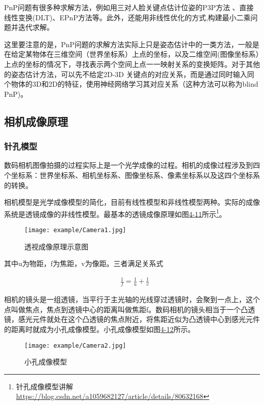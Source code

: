 PnP问题有很多种求解方法，例如用三对人脸关键点估计位姿的P3P方法 、直接线性变换(DLT)、EPnP方法等。此外，还能用非线性优化的方式,构建最小二乘问题并迭代求解。

这里要注意的是，PnP问题的求解方法实际上只是姿态估计中的一类方法，一般是在给定某物体在三维空间（世界坐标系）上点的坐标，以及二维空间(图像坐标系）上点的坐标的情况下，寻找表示两个空间上点一一映射关系的变换矩阵。对于其他的姿态估计方法，可以先不给定2D-3D 关键点的对应关系，而是通过同时输入同个物体的3D和2D的特征，使用神经网络学习其对应关系（这种方法可以称为blind PnP)。

\subsection{相机成像原理}

\subsubsection{针孔模型}

数码相机图像拍摄的过程实际上是一个光学成像的过程。相机的成像过程涉及到四个坐标系：世界坐标系、相机坐标系、图像坐标系、像素坐标系以及这四个坐标系的转换。

相机模型是光学成像模型的简化，目前有线性模型和非线性模型两种。实际的成像系统是透镜成像的非线性模型。最基本的透镜成像原理如图\href{fig:4-11}{4-11}所示\footnote{针孔成像模型讲解 \quad \url{https://blog.csdn.net/a1059682127/article/details/80632168}}。

\begin{figure}[!htp]
\centering
\texttt{[image: example/Camera1.jpg]}
\caption{透视成像原理示意图}
\label{fig1:4-11}
\end{figure}

其中u为物距，f为焦距，v为像距。三者满足关系式

\begin{align}
& \frac{1}{f} = \frac{1}{u} + \frac{1}{v}
\end{align}

相机的镜头是一组透镜，当平行于主光轴的光线穿过透镜时，会聚到一点上，这个点叫做焦点，焦点到透镜中心的距离叫做焦距f。数码相机的镜头相当于一个凸透镜，感光元件就处在这个凸透镜的焦点附近，将焦距近似为凸透镜中心到感光元件的距离时就成为小孔成像模型。小孔成像模型如图\href{fig:4-12}{4-12}所示。

\begin{figure}[!htp]
\centering
\texttt{[image: example/Camera2.jpg]}
\caption{小孔成像模型}
\label{fig1:4-11}
\end{figure}

